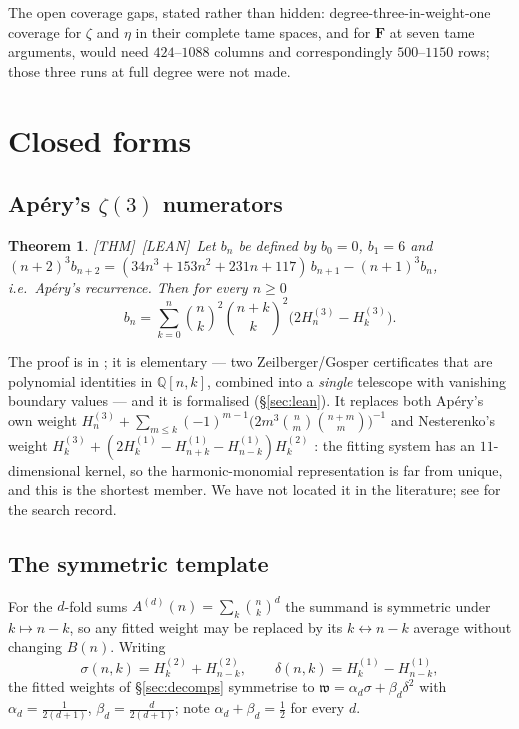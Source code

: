 \documentclass[11pt,reqno]{amsart}
\theoremstyle{plain}
\newtheorem{theorem}{Theorem}[section]
\theoremstyle{definition}
\theoremstyle{remark}
\newcommand{\Q}{\mathbb{Q}}
\newcommand{\bin}[2]{\binom{#1}{#2}}
\newcommand{\HH}[2]{H^{(#1)}_{#2}}
\newcommand{\Thm}{\textup{\textsf{[THM]}}}
\newcommand{\Lean}{\textup{\textsf{[LEAN]}}}
\numberwithin{equation}{section}
\begin{document}
The open coverage gaps, stated rather than hidden: degree-three-in-weight-one coverage for
$\zeta$ and $\eta$ in their complete tame spaces, and for $\mathbf F$ at seven tame
arguments, would need $424$--$1088$ columns and correspondingly $500$--$1150$ rows; those
three runs at full degree were not made.

\section{Closed forms}\label{sec:closed}

\subsection{Ap\'ery's $\zeta(3)$ numerators}
\begin{theorem}\label{thm:gamma}
\Thm\ \Lean\ Let $b_n$ be defined by $b_0=0$, $b_1=6$ and
$(n+2)^3b_{n+2}=(34n^3+153n^2+231n+117)\,b_{n+1}-(n+1)^3b_n$, i.e.\ Ap\'ery's recurrence.
Then for every $n\ge0$
\[
  b_n=\sum_{k=0}^n\bin nk^2\bin{n+k}k^2\bigl(2\HH3n-\HH3k\bigr).
\]
\end{theorem}

The proof is in \cite{CompanionLucasMin}; it is elementary --- two Zeilberger/Gosper
certificates that are polynomial identities in $\Q[n,k]$, combined into a \emph{single}
telescope with vanishing boundary values --- and it is formalised (\S\ref{sec:lean}). It
replaces both Ap\'ery's own weight
$\HH3n+\sum_{m\le k}(-1)^{m-1}\bigl(2m^3\bin nm\bin{n+m}m\bigr)^{-1}$ and Nesterenko's
weight $\HH3k+(2\HH1k-\HH1{n+k}-\HH1{n-k})\HH2k$ \cite{Nesterenko1996}: the fitting system
has an $11$-dimensional kernel, so the harmonic-monomial representation is far from unique,
and this is the shortest member. We have not located it in the literature; see
\cite[\S9]{CompanionLucasMin} for the search record.

\subsection{The symmetric template}\label{sec:template}
For the $d$-fold sums $A^{(d)}(n)=\sum_k\bin nk^d$ the summand is symmetric under
$k\mapsto n-k$, so any fitted weight may be replaced by its $k\leftrightarrow n-k$ average
without changing $B(n)$. Writing
\begin{equation}\label{eq:sigmadelta}
  \sigma(n,k)=\HH2k+\HH2{n-k},\qquad \delta(n,k)=\HH1k-\HH1{n-k},
\end{equation}
the fitted weights of \S\ref{sec:decomps} symmetrise to
$\mathfrak w=\alpha_d\sigma+\beta_d\delta^2$ with
$\alpha_d=\tfrac1{2(d+1)}$, $\beta_d=\tfrac d{2(d+1)}$; note $\alpha_d+\beta_d=\tfrac12$ for
every $d$.
\end{document}
